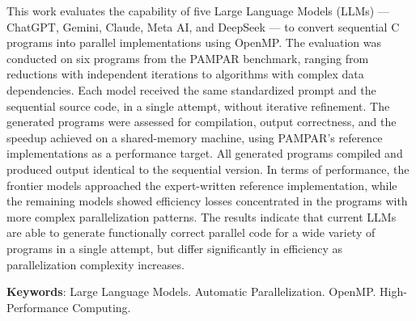 \begin{resumo}[Abstract]
This work evaluates the capability of five Large Language Models (LLMs) --- ChatGPT, Gemini, Claude, Meta AI, and DeepSeek --- to convert sequential C programs into parallel implementations using OpenMP. 
The evaluation was conducted on six programs from the PAMPAR benchmark, ranging from reductions with independent iterations to algorithms with complex data dependencies. 
Each model received the same standardized prompt and the sequential source code, in a single attempt, without iterative refinement. 
The generated programs were assessed for compilation, output correctness, and the speedup achieved on a shared-memory machine, using PAMPAR's reference implementations as a performance target. 
All generated programs compiled and produced output identical to the sequential version. 
In terms of performance, the frontier models approached the expert-written reference implementation, while the remaining models showed efficiency losses concentrated in the programs with more complex parallelization patterns. 
The results indicate that current LLMs are able to generate functionally correct parallel code for a wide variety of programs in a single attempt, but differ significantly in efficiency as parallelization complexity increases.

\vspace{\onelineskip}
\noindent
\textbf{Keywords}: Large Language Models. Automatic Parallelization. OpenMP. High-Performance Computing.
\end{resumo}